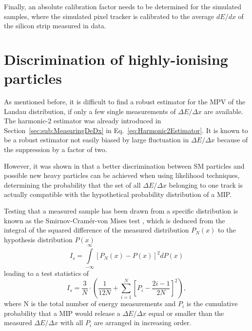 Finally, an absolute calibration factor needs to be determined for the simulated samples, where the simulated pixel tracker is calibrated to the average $dE/dx$ of the silicon strip measured in data.

\section{Discrimination of highly-ionising particles}

As mentioned before, it is difficult to find a robust estimator for the MPV of the Landau distribution, if only a few single measurements of $\Delta E/ \Delta x$  are available.
The harmonic-2 estimator \ihtwo was already introduced in Section~\ref{sec:sub:MeasuringDeDx} in Eq.~\ref{eq:Harmonic2Estimator}.
It is known to be a robust estimator not easily biased by large fluctuation in $\Delta E/ \Delta x$ because of the suppression by a factor of two.

However, it was shown in \cite{bib:Quertenmont_2010} that a better discrimination between SM particles and possible new heavy particles can be achieved when using likelihood techniques,
\ie determining the probability that the set of all $\Delta E/ \Delta x$ belonging to one track is actually compatible with the hypothetical probability distribution of a MIP.

Testing that a measured sample has been drawn from a specific distribution is known as the Smirnov-Cram\'{e}r-von Mises test \cite{bib:Anderson:CramerVonMises_1962,bib:James:StaticticalMethods_2006},
which is deduced from the integral of the squared difference of the measured distribution $P_N(x)$ to the hypothesis distribution $P(x)$
\begin{equation*}
I_s = \int\limits_{-\infty}^{\infty} \left[P_{N}(x)-P(x)\right]^2 dP(x)
\end{equation*}
leading to a test statistics of
\begin{equation*}
I_s = \frac{3}{N} \cdot \left( \frac{1}{12N} + \sum\limits_{i=1}^N \left[ P_i - \frac{2i-1}{2N} \right]^2 \right),
\end{equation*}
where N is the total number of energy measurements and $P_i$ is the cumulative probability that a MIP would release a $\Delta E/\Delta x$ equal or smaller than the measured $\Delta E/ \Delta x$ with all $P_i$ are arranged in increasing order.


